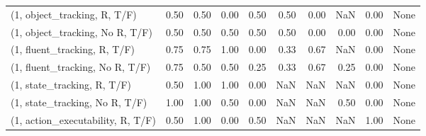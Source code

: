 \begin{table*}[h!]
\begin{adjustbox}{width=2\columnwidth,center}
\begin{tabular}{lrrr|rrr|rrr}
\midrule
(1, object\_tracking, R, T/F)         &                      0.50 &                  0.50 &                      0.00 &                          0.50 &                      0.50 &                          0.00 &                                    NaN &                               0.00 &                                  None \\
(1, object\_tracking, No R, T/F)      &                      0.50 &                  0.50 &                      0.50 &                          0.50 &                      0.50 &                          0.00 &                                   0.00 &                               0.00 &                                  None \\
(1, fluent\_tracking, R, T/F)         &                      0.75 &                  0.75 &                      1.00 &                          0.00 &                      0.33 &                          0.67 &                                    NaN &                               0.00 &                                  None \\
(1, fluent\_tracking, No R, T/F)      &                      0.75 &                  0.50 &                      0.50 &                          0.25 &                      0.33 &                          0.67 &                                   0.25 &                               0.00 &                                  None \\
(1, state\_tracking, R, T/F)          &                      0.50 &                  1.00 &                      1.00 &                          0.00 &                       NaN &                           NaN &                                    NaN &                               0.00 &                                  None \\
(1, state\_tracking, No R, T/F)       &                      1.00 &                  1.00 &                      0.50 &                          0.00 &                       NaN &                           NaN &                                   0.50 &                               0.00 &                                  None \\
(1, action\_executability, R, T/F)    &                      0.50 &                  1.00 &                      0.00 &                          0.50 &                       NaN &                           NaN &                                    NaN &                               1.00 &                                  None \\

\end{tabular}
\end{adjustbox}
\end{table*}
